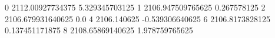 0 2112.00927734375 5.329345703125
1 2106.947509765625 0.267578125
2 2106.679931640625 0.0
4 2106.140625 -0.539306640625
6 2106.8173828125 0.137451171875
8 2108.65869140625 1.978759765625
